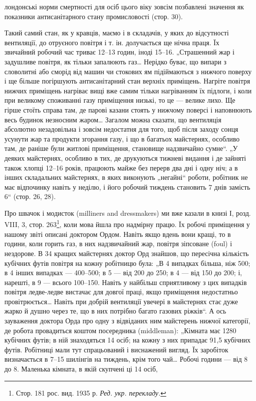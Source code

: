 \parcont{}  %
лондонські норми смертності для осіб цього віку зовсім позбавлені значення як показники
антисанітарного стану промисловості (стор. 30).

Такий самий стан, як у кравців, маємо і в складачів, у яких
до відсутності вентиляції, до отруєного повітря і т. ін. долучається ще нічна праця. Їх звичайний
робочий час триває
12--13 годин, іноді 15--16. „Страшенний жар і задушливе повітря, як тільки запалюють газ\dots{} Нерідко
буває, що випари
з словолитні або сморід від машин чи стокових ям підіймаються
з нижчого поверху і ще більше погіршують антисанітарний стан
верхніх приміщень. Нагріте повітря нижчих приміщень нагріває
вищі вже самим тільки нагріванням їх підлоги, і коли при великому споживанні газу приміщення низькі,
то це — велике лихо.
Ще гірше стоїть справа там, де парові казани стоять у нижчому
поверсі і наповнюють весь будинок незносним жаром\dots{} Загалом можна сказати, що вентиляція абсолютно
незадовільна
і зовсім недостатня для того, щоб після заходу сонця усунути
жар та продукти згорання газу, і що в багатьох майстернях,
особливо там, де раніше були житлові приміщення, становище
надзвичайно сумне“. „У деяких майстернях, особливо в тих,
де друкуються тижневі видання і де зайняті також хлопці 12--16 років, працюють майже без перерв два
дні і одну ніч; а в інших складальних майстернях, в яких виконують „негайні“ роботи,
робітник не має відпочинку навіть у неділю, і його робочий
тиждень становить 7 днів замість 6“ (стор. 26, 28).

Про швачок і модисток (milliners and dressmakers) ми вже
казали в книзі І, розд. VIII, 3, стор. 263\footnote*{Стор. 181 рос. вид. 1935 р. \emph{Ред. укр. перекладу.}}, коли мова йшла про
надмірну працю. Їх робочі приміщення у нашому звіті описані
доктором Ордом. Навіть якщо вдень вони кращі, то в години,
коли горить газ, в них надзвичайний жар, повітря зіпсоване (foul)
і нездорове. В 34 кращих майстернях доктор Орд знайшов, що
пересічна кількість кубічних футів повітря на кожну робітницю була: „В 4 випадках більша, ніж 500; в
4 інших випадках —
400--500; в 5 — від 200 до 250; в 4 — від 150 до 200; і, нарешті,
в 9 — всього 100--150. Навіть у найбільш сприятливому з цих
випадків повітря ледве-ледве вистачає для довгої праці, якщо
приміщення недостатньо провітрюється\dots{} Навіть при добрій вентиляції увечері в майстернях стає дуже
жарко й душно через
те, що в них потрібно багато газових ріжків“. А ось зауваження
доктора Орда про одну з відвіданих ним майстерень нижчої
категорії, де робота провадиться коштом посередника (middleman):
„Кімната має 1280 кубічних футів; в ній знаходяться
14 осіб; на кожну з них припадає 91,5 кубічних футів. Робітниці мали тут спрацьований і виснажений
вигляд. Їх заробіток
визначається в 7--15 шилінгів на тиждень, крім того чай\dots{} Робочі
години — від 8 до 8. Маленька кімната, в якій скупчені ці 14 осіб,
\parbreak{}  %
